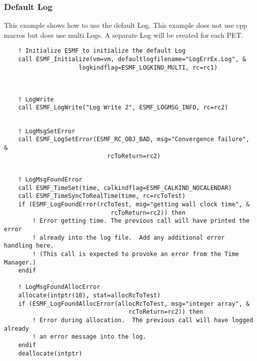 
  \subsubsection{Default Log}
 
   This example shows how to use the default Log.  This example does not use cpp
   macros but does use multi Logs.  A separate Log will be created for each PET. 

 \begin{verbatim}
    ! Initialize ESMF to initialize the default Log
    call ESMF_Initialize(vm=vm, defaultlogfilename="LogErrEx.Log", &
                     logkindflag=ESMF_LOGKIND_MULTI, rc=rc1)

 
\end{verbatim}
 

 \begin{verbatim}
    ! LogWrite
    call ESMF_LogWrite("Log Write 2", ESMF_LOGMSG_INFO, rc=rc2)
 
\end{verbatim}
 

 \begin{verbatim}
    ! LogMsgSetError
    call ESMF_LogSetError(ESMF_RC_OBJ_BAD, msg="Convergence failure", &
                             rcToReturn=rc2)
 
\end{verbatim}
 

 \begin{verbatim}
    ! LogMsgFoundError
    call ESMF_TimeSet(time, calkindflag=ESMF_CALKIND_NOCALENDAR)
    call ESMF_TimeSyncToRealTime(time, rc=rcToTest)
    if (ESMF_LogFoundError(rcToTest, msg="getting wall clock time", &
                              rcToReturn=rc2)) then
        ! Error getting time. The previous call will have printed the error
        ! already into the log file.  Add any additional error handling here.
        ! (This call is expected to provoke an error from the Time Manager.)
    endif

    ! LogMsgFoundAllocError
    allocate(intptr(10), stat=allocRcToTest)
    if (ESMF_LogFoundAllocError(allocRcToTest, msg="integer array", &
                                   rcToReturn=rc2)) then
        ! Error during allocation.  The previous call will have logged already
        ! an error message into the log.
    endif
    deallocate(intptr)
 
\end{verbatim}
 
